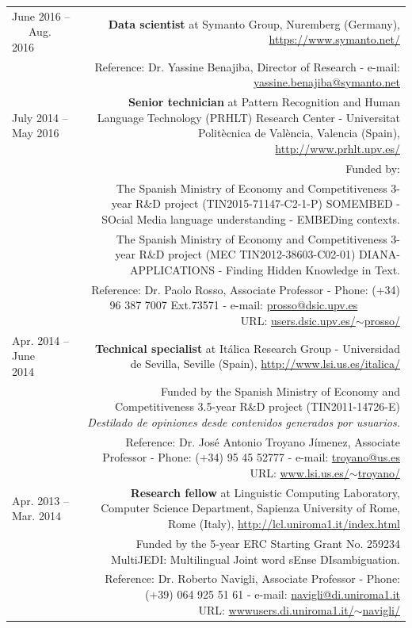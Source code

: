 \documentclass[10pt]{article}
\begin{document}
\begin{tabular}{L!{\VRule}R}
June 2016 -- ~~~Aug. 2016 ~~&{\textbf{Data scientist} at Symanto Group, Nuremberg (Germany), \url{https://www.symanto.net/}}\\
&\scriptsize{Reference: Dr. Yassine Benajiba, Director of Research - e-mail: \href{mailto:yassine.benajiba@symanto.net}{yassine.benajiba@symanto.net}}\\

July 2014 -- May 2016 ~~&{\textbf{Senior technician} at Pattern Recognition and Human Language Technology (PRHLT) Research Center - Universitat Polit{\`e}cnica de Val{\`e}ncia, Valencia (Spain),
\url{http://www.prhlt.upv.es/}}\\
&\scriptsize{Funded by:}\\
&\scriptsize{\textcolor{white}{ssss}The Spanish Ministry of Economy and Competitiveness 3-year R\&D project (TIN2015-71147-C2-1-P) SOMEMBED - SOcial Media language 
understanding - EMBEDing contexts.}\\
&\scriptsize{\textcolor{white}{ssss}The Spanish Ministry of Economy and Competitiveness 3-year R\&D project (MEC TIN2012-38603-C02-01) DIANA-APPLICATIONS - Finding Hidden Knowledge 
in Text.}\\
&\scriptsize{Reference: Dr. Paolo Rosso, Associate Professor - Phone: (+34) 96 387 7007 Ext.73571 - e-mail: \href{mailto:prosso@dsic.upv.es}{prosso@dsic.upv.es} ~~~~~~~ URL: \href{http://users.dsic.upv.es/~prosso/}{users.dsic.upv.es/$\sim$prosso/}}\\

Apr. 2014 -- June 2014~~~~&{\textbf{Technical specialist} at It{\'a}lica Research Group - Universidad de Sevilla, Seville (Spain), 
\url{http://www.lsi.us.es/italica/}}\\
&\scriptsize{Funded by the Spanish Ministry of Economy and Competitiveness 3.5-year R\&D project (TIN2011-14726-E) \emph{Destilado de opiniones desde contenidos generados por 
usuarios.}}\\
&\scriptsize{Reference: Dr. Jos{\'e} Antonio Troyano J{\'i}menez, Associate Professor - Phone: (+34) 95 45 52777 - e-mail: \href{mailto:troyano@us.es}{troyano@us.es} ~~~~~~~ URL: \href{http://www.lsi.us.es/~troyano/}{www.lsi.us.es/$\sim$troyano/}}\\
 
Apr. 2013 -- Mar. 2014 ~~&{\textbf{Research fellow} at Linguistic Computing Laboratory, Computer Science Department, Sapienza University of Rome, Rome (Italy), \url{http://lcl.uniroma1.it/index.html}}\\
&\scriptsize{Funded by the 5-year ERC Starting Grant No. 259234 MultiJEDI: Multilingual Joint word sEnse DIsambiguation.}\\
&\scriptsize{Reference: Dr. Roberto Navigli, Associate Professor - Phone: (+39) 064 925 51 61 - e-mail: \href{mailto:navigli@di.uniroma1.it}{navigli@di.uniroma1.it} ~~~~~~~~~~ URL: \href{http://wwwusers.di.uniroma1.it/~navigli/}{wwwusers.di.uniroma1.it/$\sim$navigli/}}\\


\end{tabular}
\end{document}
